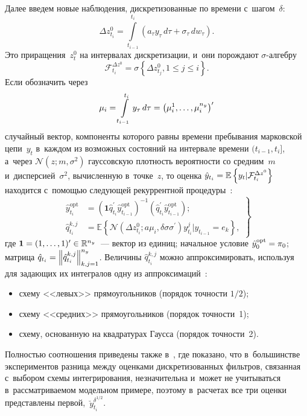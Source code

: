 \begin{multicols}{2}
      Далее введем новые наблюдения, дискретизованные по времени 
с~шагом~$\delta$: 
$$
\Delta z^0_{t_i}= \int\limits^{t_i}_{t_{i-1}} (a_\tau y_\tau \,d\tau + \sigma_\tau \,dw_\tau).
$$
 Это приращения~$z_t^0$ на 
интервалах дискретизации, и~они по\-рож\-да\-ют $\sigma$-ал\-геб\-ру 
$$
\mathcal{F}_{t_i}^{\Delta z^0} = \sigma \left\{ \Delta z^0_{t_j}, 1\leq j\leq i\right\}.
$$
 Если обозначить через 
 $$
 \mu_i=  \int\limits^{t_i}_{t_{i-1}} y_\tau \,d\tau \hm= \left( \mu_i^1, \ldots , \mu_i^{n_y}\right)^\prime
 $$ случайный вектор, компоненты которого рав\-ны 
времени пребывания марковской цепи~$y_t$ в~каждом из воз\-мож\-ных 
со\-сто\-яний на интервале времени $(t_{i-1}, t_i]$, а~через $\mathcal{N}(z; 
m,\sigma^2)$ гауссовскую плот\-ность ве\-ро\-ят\-ности со сред\-ним~$m$ 
и~дисперсией~$\sigma^2$, вы\-чис\-лен\-ную в~точ\-ке~$z$, то оценка  
$\hat{y}_{t_i} \hm= \mathbb{E}\left\{ y_t\vert \mathcal{F}_{t_i}^{\Delta 
z^0}\right\}$ находится с~по\-мощью сле\-ду\-ющей рекуррентной 
процедуры~\cite{17-bos}:
      \begin{equation}
      \left.
      \begin{array}{rl}
     \!\! \hat{y}^{\mathrm{opt}}_{t_i}& =\left( \mathbf{1} \hat{q}_{t_i}^\prime 
\hat{y}^{\mathrm{opt}}_{t_{i-1}} \right)^{-1} \left( \hat{q}^\prime_{t_i} 
\hat{y}^{\mathrm{opt}}_{t_{i-1}} \right);\\[6pt]
     \!\! \hat{q}^{k,j}_{t_i}&=\mathbb{E}\left\{ \mathcal{N}\left( \Delta z^0_{t_i}; 
a \mu_i, \delta \sigma\sigma^\prime\right) y^j_{t_i}\vert y_{t_{i-1}} =e_k\right\},
\end{array}\!
\right\}\!
      \label{e8-bos}
      \end{equation}
где $\mathbf{1} \hm= (1, \ldots , 1)^\prime \hm\in \mathbb{R}^{n_y}$~--- 
вектор из единиц; начальное условие $\hat{y}_0^{\mathrm{opt}} \hm= \pi_0$; мат\-ри\-ца 
$\hat{q}_{t_i}\hm= \left\| \hat{q}_{t_i}^{k,j}\right\|^{n_y}_{k,j=1}$. Величины 
$\hat{q}^{k,j}_{t_i}$ можно аппроксимировать, используя для за\-да\-ющих их 
интегралов одну из аппроксимаций~\cite{18-bos}:
\begin{itemize}
     \item схему <<левых>> прямоугольников (порядок точ\-ности $1/2$);
     \item схему <<средних>> прямоугольников (порядок точ\-ности~1);
     \item схему, основанную на квад\-ра\-ту\-рах Гаусса (порядок точ\-ности~2).
     \end{itemize}
     
     Полностью соотношения приведены также в~\cite{19-bos}, где 
показано, что в~большинстве экспериментов разница меж\-ду оценками 
дис\-кре\-ти\-зо\-ванных фильт\-ров, связанная с~выбором схемы интегрирования, 
незначительна и~может не учитываться в~рас\-смат\-ри\-ва\-емом модельном 
примере, поэтому в~расчетах все три оценки пред\-став\-ле\-ны пер\-вой,~$\breve{y}_{t_i}^{\delta^{1/2}}$.
{

}
\end{multicols}
